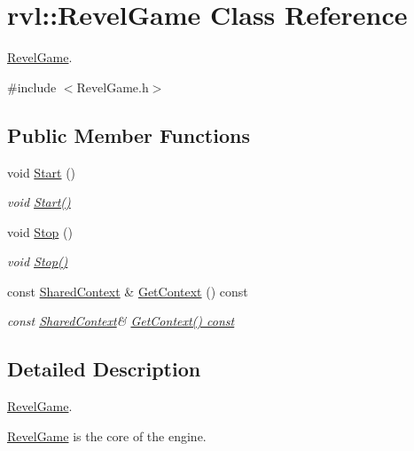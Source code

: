 \hypertarget{classrvl_1_1_revel_game}{}\section{rvl\+:\+:Revel\+Game Class Reference}
\label{classrvl_1_1_revel_game}


\hyperlink{classrvl_1_1_revel_game}{Revel\+Game}.  




{\ttfamily \#include $<$Revel\+Game.\+h$>$}

\subsection*{Public Member Functions}
\begin{DoxyCompactItemize}
\item 
void \hyperlink{classrvl_1_1_revel_game_aaef0b7a8d82a7cc326b39f45c3be0b83}{Start} ()
\begin{DoxyCompactList}\small\item\em void \hyperlink{classrvl_1_1_revel_game_aaef0b7a8d82a7cc326b39f45c3be0b83}{Start()} \end{DoxyCompactList}\item 
void \hyperlink{classrvl_1_1_revel_game_ae2e535afe54176e266c1ec25ad11f9bc}{Stop} ()
\begin{DoxyCompactList}\small\item\em void \hyperlink{classrvl_1_1_revel_game_ae2e535afe54176e266c1ec25ad11f9bc}{Stop()} \end{DoxyCompactList}\item 
const \hyperlink{structrvl_1_1_shared_context}{Shared\+Context} \& \hyperlink{classrvl_1_1_revel_game_ab5f7b1a12844e3481d66ab00db1f0104}{Get\+Context} () const
\begin{DoxyCompactList}\small\item\em const \hyperlink{structrvl_1_1_shared_context}{Shared\+Context}\& \hyperlink{classrvl_1_1_revel_game_ab5f7b1a12844e3481d66ab00db1f0104}{Get\+Context() const} \end{DoxyCompactList}\end{DoxyCompactItemize}


\subsection{Detailed Description}
\hyperlink{classrvl_1_1_revel_game}{Revel\+Game}. 

\hyperlink{classrvl_1_1_revel_game}{Revel\+Game} is the core of the engine. 

